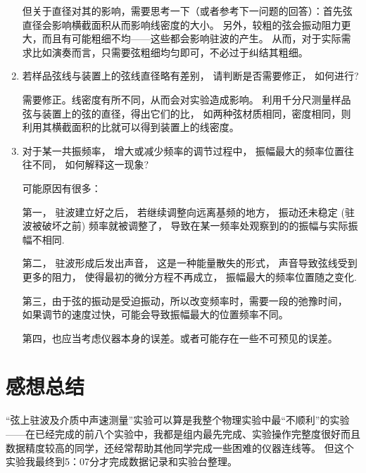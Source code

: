 \documentclass[11pt]{article}
\begin{document}
\begin{enumerate}
\begin{kaishu}
但关于直径对其的影响，需要思考一下（或者参考下一问题的回答）：首先弦直径会影响横截面积从而影响线密度的大小。
另外，较粗的弦会振动阻力更大，而且有可能粗细不均——这些都会影响驻波的产生。
从而，对于实际需求比如演奏而言，只需要弦粗细均匀即可，不必过于纠结其粗细。

    \end{kaishu}
   
    \item 若样品弦线与装置上的弦线直径略有差别， 请判断是否需要修正， 如何进行?
    
    \begin{kaishu}
        需要修正。线密度有所不同，从而会对实验造成影响。
        利用千分尺测量样品弦与装置上的弦的直径，得出它们的比，
        如两种弦材质相同，密度相同，则利用其横截面积的比就可以得到装置上的线密度。
    \end{kaishu}
  
    \item 对于某一共振频率， 
    增大或减少频率的调节过程中， 
    振幅最大的频率位置往往不同， 
    如何解释这一现象?
    
    \begin{kaishu}
         可能原因有很多：
         
    第一， 驻波建立好之后， 
    若继续调整向远离基频的地方， 
    振动还未稳定 (驻波被破坏之前) 频率就被调整了， 
    导致在某一频率处观察到的的振幅与实际振幅不相同. 

    第二， 驻波形成后发出声音， 这是一种能量散失的形式， 
    声音导致弦线受到更多的阻力， 使得最初的微分方程不再成立， 
    振幅最大的频率位置随之变化.

    第三，由于弦的振动是受迫振动，所以改变频率时，需要一段的弛豫时间，
    如果调节的速度过快，可能会导致振幅最大的位置频率不同。
    
    第四，也应当考虑仪器本身的误差。或者可能存在一些不可预见的误差。
    \end{kaishu}
   
\end{enumerate}



\section{感想总结}


“弦上驻波及介质中声速测量”实验可以算是我整个物理实验中最“不顺利”的实验——在已经完成的前八个实验中，我都是组内最先完成、实验操作完整度很好而且数据精度较高的同学，还经常帮助其他同学完成一些困难的仪器连线等。
但这个实验我最终到5：07分才完成数据记录和实验台整理。
\end{document}
